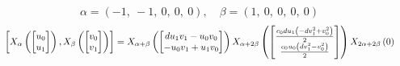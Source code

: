 \documentclass[11pt]{article}
\theoremstyle{definition}
\begin{document}
\[
\alpha = \left( -1, \  -1, \  0, \  0, \  0\right), \quad \beta = \left( 1, \  0, \  0, \  0, \  0\right)
\]
\[
\scaletoalign{\textwidth}{\left[ X_{\alpha}\left(\left[\begin{matrix}u_{0}\\u_{1}\end{matrix}\right]\right), X_{\beta}\left(\left[\begin{matrix}v_{0}\\v_{1}\end{matrix}\right]\right) \right] = X_{\alpha + \beta}\left(\left[\begin{matrix}d u_{1} v_{1} - u_{0} v_{0}\\- u_{0} v_{1} + u_{1} v_{0}\end{matrix}\right]\right) X_{\alpha + 2\beta}\left(\left[\begin{matrix}\frac{c_{0} d u_{1} \left(- d v_{1}^{2} + v_{0}^{2}\right)}{2}\\\frac{c_{0} u_{0} \left(d v_{1}^{2} - v_{0}^{2}\right)}{2}\end{matrix}\right]\right) X_{2\alpha + 2\beta}\left(0\right)}
\]
\end{document}

